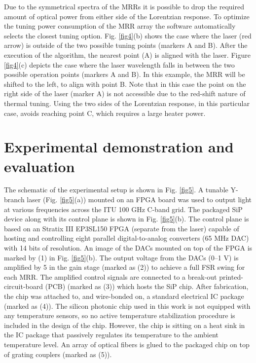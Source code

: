Due to the symmetrical spectra of the MRRs it is possible to drop the required amount of optical power from either side of the Lorentzian response. To optimize the tuning power consumption of the MRR array the software automatically selects the closest tuning option. Fig. \ref{fig4}(b) shows the case where the laser (red arrow) is outside of the two possible tuning points (markers A and B). After the execution of the algorithm, the nearest point (A) is aligned with the laser. Figure \ref{fig4}(c) depicts the case where the laser wavelength falls in between the two possible operation points (markers A and B). In this example, the MRR will be shifted to the left, to align with point B. Note that in this case the point on the right side of the laser (marker A) is not accessible due to the red-shift nature of thermal tuning. Using the two sides of the Lorentzian response, in this particular case, avoids reaching point C, which requires a large heater power. 



\section{Experimental demonstration and evaluation}

The schematic of the experimental setup is shown in Fig. \ref{fig5}. A tunable Y-branch laser \cite{browning2013optical} (Fig. \ref{fig5}(a)) mounted on an FPGA board was used to output light at various frequencies across the ITU 100 GHz C-band grid. The packaged SiP device along with its control plane is shown in Fig. \ref{fig5}(b). The control plane is based on an Stratix III EP3SL150 FPGA (separate from the laser) capable of hosting and controlling eight parallel digital-to-analog converters (65 MHz DAC) with 14 bits of resolution. An image of the DACs mounted on top of the FPGA is marked by (1) in Fig. \ref{fig5}(b). The output voltage from the DACs (0--1 V) is amplified by 5 in the gain stage (marked as (2)) to achieve a full FSR swing for each MRR. The amplified control signals are connected to a break-out printed-circuit-board (PCB) (marked as (3)) which hosts the SiP chip. After fabrication, the chip was attached to, and wire-bonded on, a standard electrical IC package (marked as (4)). The silicon photonic chip used in this work is not equipped with any temperature sensors, so no active temperature stabilization procedure is included in the design of the chip. However, the chip is sitting on a heat sink in the IC package that passively regulates its temperature to the ambient temperature level. An array of optical fibers is glued to the packaged chip on top of grating couplers (marked as (5)). 

